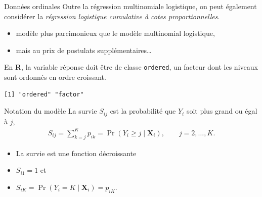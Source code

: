 \documentclass[
  ignorenonframetext,
]{beamer}
\newenvironment{Shaded}{\begin{snugshade}}{\end{snugshade}}
\newcommand{\FunctionTok}[1]{\textcolor[rgb]{0.28,0.35,0.67}{#1}}
\newcommand{\NormalTok}[1]{\textcolor[rgb]{0.00,0.23,0.31}{#1}}
\newcommand{\SpecialCharTok}[1]{\textcolor[rgb]{0.37,0.37,0.37}{#1}}
\providecommand{\tightlist}{%
  \setlength{\itemsep}{0pt}\setlength{\parskip}{0pt}}\usepackage{longtable,booktabs,array}
\begin{document}
\begin{frame}[fragile]{Données ordinales}
\protect\hypertarget{donnuxe9es-ordinales}{}
Outre la régression multinomiale logistique, on peut également
considérer la \emph{régression logistique cumulative à cotes
proportionnelles}.

\begin{itemize}
\tightlist
\item
  modèle plus parcimonieux que le modèle multinomial logistique,
\item
  mais au prix de postulats supplémentaires\ldots{}
\end{itemize}

En \textbf{R}, la variable réponse doit être de classe \texttt{ordered},
un facteur dont les niveaux sont ordonnés en ordre croissant.

\begin{Shaded}
\end{Shaded}

\begin{verbatim}
[1] "ordered" "factor" 
\end{verbatim}
\end{frame}

\begin{frame}{Notation du modèle}
\protect\hypertarget{notation-du-moduxe8le}{}
La survie \(S_{ij}\) est la probabilité que \(Y_i\) soit plus grand ou
égal à \(j\), \begin{align*}
S_{ij}=\sum_{k=j}^K p_{ik}= \Pr(Y_{i} \ge j \mid \mathbf{X}_{i}), \qquad j=2, \ldots, K.
\end{align*}

\begin{itemize}
\tightlist
\item
  La survie est une fonction décroissante
\item
  \(S_{i1}=1\) et
\item
  \(S_{iK} = \Pr(Y_i=K \mid \mathbf{X}_{i})=p_{iK}\).
\end{itemize}
\end{frame}
\end{document}
